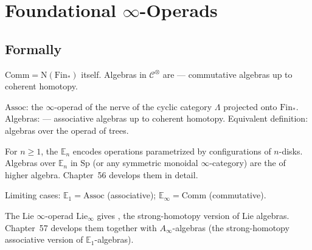 \section{Foundational $\infty$-Operads}
\label{sec:fundamental-operads}

\subsection{Formally}

\begin{example_thm}
\label{ex:comm-operad-infty}
$\mathrm{Comm} = \mathrm{N}(\mathrm{Fin}_*)$ itself. Algebras in
$\mathcal{C}^\otimes$ are  —
commutative algebras up to coherent homotopy.
\end{example_thm}

\begin{example_thm}
\label{ex:assoc-operad-infty}
$\mathrm{Assoc}$: the $\infty$-operad of the nerve of the cyclic category
$\Lambda$ projected onto $\mathrm{Fin}_*$. Algebras: 
— associative algebras up to coherent homotopy. Equivalent definition:
algebras over the operad of trees.
\end{example_thm}

\begin{example_thm}
\label{ex:En-preview}
For $n \geq 1$, the  $\mathbb{E}_n$ encodes
operations parametrized by configurations of $n$-disks. Algebras over
$\mathbb{E}_n$ in $\mathrm{Sp}$ (or any symmetric monoidal $\infty$-category)
are the  of higher algebra. Chapter~56
develops them in detail.

Limiting cases: $\mathbb{E}_1 = \mathrm{Assoc}$ (associative);
$\mathbb{E}_\infty = \mathrm{Comm}$ (commutative).
\end{example_thm}

\begin{remark}
The Lie $\infty$-operad $\mathrm{Lie}_\infty$ gives ,
the strong-homotopy version of Lie algebras. Chapter~57 develops them
together with $A_\infty$-algebras (the strong-homotopy associative version
of $\mathbb{E}_1$-algebras).
\end{remark}


